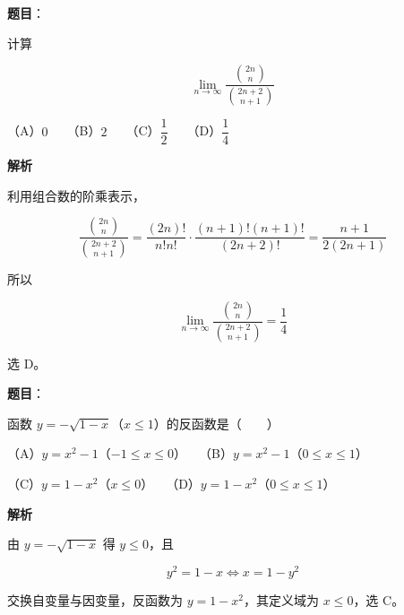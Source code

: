 \begin{answer}

\textbf{题目}：

计算

\nopagebreak[4]
\[
\lim_{n\to\infty}\frac{\binom{2n}{n}}{\binom{2n+2}{n+1}}
\]

（A）$0$　　（B）$2$　　（C）$\dfrac12$　　（D）$\dfrac14$

\textbf{解析}

利用组合数的阶乘表示，

\nopagebreak[4]
\[
\frac{\binom{2n}{n}}{\binom{2n+2}{n+1}}
=\frac{(2n)!}{n!n!}\cdot\frac{(n+1)!(n+1)!}{(2n+2)!}
=\frac{n+1}{2(2n+1)}
\]

所以

\nopagebreak[4]
\[
\lim_{n\to\infty}\frac{\binom{2n}{n}}{\binom{2n+2}{n+1}}=\frac14
\]

选 D。


\end{answer}
\begin{answer}

\textbf{题目}：

函数 $y=-\sqrt{1-x}$（$x\le1$）的反函数是\mbox{（　　）}

（A）$y=x^2-1$（$-1\le x\le0$）　　（B）$y=x^2-1$（$0\le x\le1$）

（C）$y=1-x^2$（$x\le0$）　　（D）$y=1-x^2$（$0\le x\le1$）

\textbf{解析}

由 $y=-\sqrt{1-x}$ 得 $y\le0$，且

\nopagebreak[4]
\[
y^2=1-x
\Longleftrightarrow
x=1-y^2
\]

交换自变量与因变量，反函数为 $y=1-x^2$，其定义域为 $x\le0$，选 C。


\end{answer}

